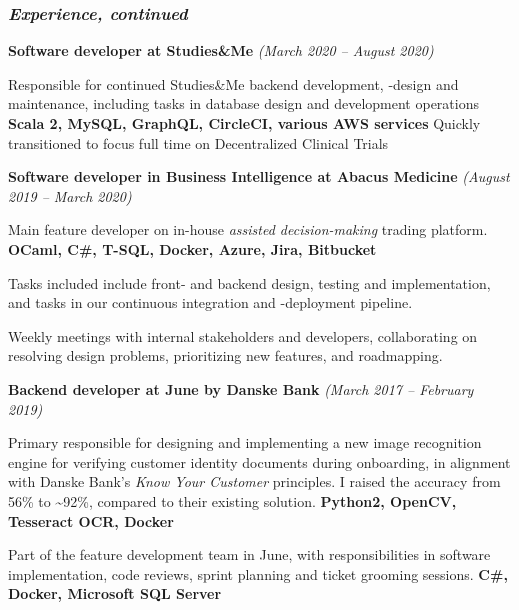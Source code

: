 \documentclass[10pt, a4paper]{article}
\begin{document}
\subsubsection*{\textit{Experience, continued}}
\textbf{Software developer at Studies\&Me} \textit{(March 2020 -- August 2020)}
\begin{outline}
\1 Responsible for continued Studies\&Me backend development, -design and maintenance, including tasks in database design and development operations\newline
    {\footnotesize \textbf{Scala 2, MySQL, GraphQL, CircleCI, various AWS services}}
\1 Quickly transitioned to focus full time on  Decentralized Clinical Trials 
\end{outline}

\textbf{Software developer in Business Intelligence at Abacus Medicine} \textit{(August 2019 -- March 2020)}
  \begin{outline}
  \1 Main feature developer on in-house \textit{assisted decision-making} trading platform.\newline
  {\footnotesize \textbf{OCaml, C\#, T-SQL, Docker, Azure, Jira, Bitbucket}}

  \1 Tasks included include front- and backend design, testing and
    implementation, and tasks in our continuous integration and -deployment pipeline.

  \1 Weekly meetings with internal stakeholders and developers, collaborating
    on resolving design problems, prioritizing new features, and roadmapping. 
  \end{outline}

\textbf{Backend developer at June by Danske Bank} \textit{(March 2017 -- February 2019)}
\begin{outline}
  \1 Primary responsible for designing and implementing a new image recognition engine for verifying customer identity documents during onboarding, in alignment with Danske Bank's \textit{Know Your Customer} principles. I raised the accuracy from 56\% to \textasciitilde 92\%, compared to their existing solution.\newline
    {\footnotesize \textbf{Python2, OpenCV, Tesseract OCR, Docker}}

  \1 Part of the feature development team in June, with responsibilities in software implementation, code reviews, sprint planning and ticket grooming sessions.\newline
    {\footnotesize \textbf{C\#, Docker, Microsoft SQL Server}}
\end{outline}
\end{document}
